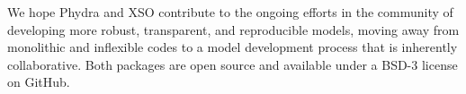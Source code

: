 \documentclass[journal abbreviation, manuscript]{copernicus}
\begin{document}
We hope Phydra and XSO contribute to the ongoing efforts in the community of developing more robust, transparent, and reproducible models, moving away from monolithic and inflexible codes to a model development process that is inherently collaborative. Both packages are open source and available under a BSD-3 license on GitHub.





















\appendix



\noappendix       %



\end{document}
